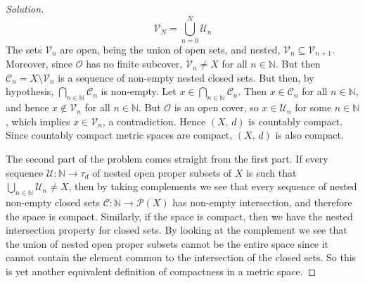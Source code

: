 \documentclass{article}
\theoremstyle{normal}
\begin{document}
\begin{proof}[Solution]
\begin{equation}
            \mathcal{V}_{N}=\bigcup_{n=0}^{N}\mathcal{U}_{n}
        \end{equation}
        The sets $\mathcal{V}_{n}$ are open, being the union of open sets, and
        nested, $\mathcal{V}_{n}\subseteq\mathcal{V}_{n+1}$. Moreover, since
        $\mathcal{O}$ has no finite subcover, $\mathcal{V}_{n}\ne{X}$ for all
        $n\in\mathbb{N}$. But then $\mathcal{C}_{n}=X\setminus\mathcal{V}_{n}$
        is a sequence of non-empty nested closed sets. But then, by hypothesis,
        $\bigcap_{n\in\mathbb{N}}\mathcal{C}_{n}$ is non-empty. Let
        $x\in\bigcap_{n\in\mathbb{N}}\mathcal{C}_{n}$. Then
        $x\in\mathcal{C}_{n}$ for all $n\in\mathbb{N}$, and hence
        $x\notin\mathcal{V}_{n}$ for all $n\in\mathbb{N}$. But
        $\mathcal{O}$ is an open cover, so $x\in\mathcal{U}_{n}$ for some
        $n\in\mathbb{N}$, which implies $x\in\mathcal{V}_{n}$, a contradiction.
        Hence $(X,\,d)$ is countably compact. Since countably compact metric
        spaces are compact, $(X,\,d)$ is also compact.
        \par\hfill\par
        The second part of the problem comes straight from the first part.
        If every sequence $\mathcal{U}:\mathbb{N}\rightarrow\tau_{d}$ of
        nested open proper subsets of $X$ is such that
        $\bigcup_{n\in\mathbb{N}}\mathcal{U}_{n}\ne{X}$, then by taking
        complements we see that every sequence of nested non-empty closed
        sets $\mathcal{C}:\mathbb{N}\rightarrow\mathcal{P}(X)$ has non-empty
        intersection, and therefore the space is compact. Similarly, if the
        space is compact, then we have the nested intersection property for
        closed sets. By looking at the complement we see that the union of
        nested open proper subsets cannot be the entire space since it cannot
        contain the element common to the intersection of the closed sets.
        So this is yet another equivalent definition of compactness in a
        metric space.
    \end{proof}
    \newpage
    \color{blue}
\end{document}
